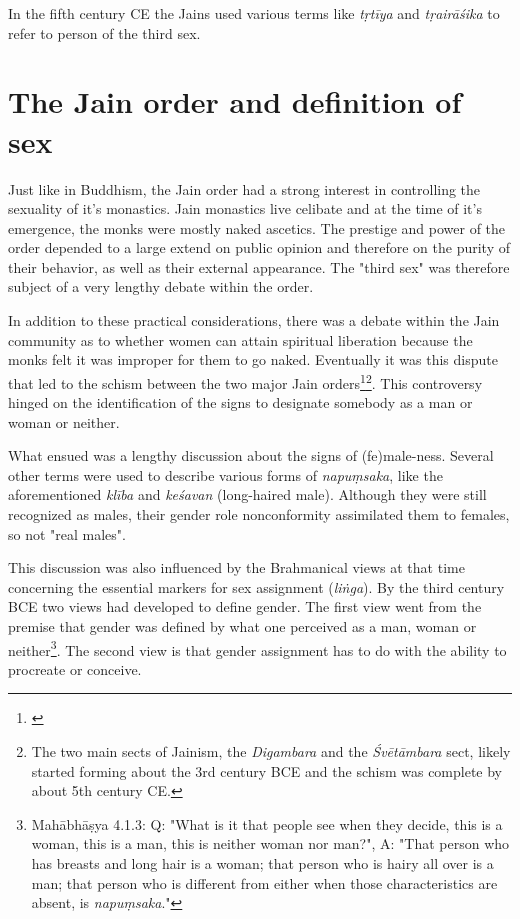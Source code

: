 In the fifth century CE the Jains used various terms like {\em tṛtīya} and {\em tṛairāśika} to refer to person of the third sex. 

\section{The Jain order and definition of sex}
Just like in Buddhism, the Jain order had a strong interest in controlling the sexuality of it's monastics. Jain monastics live celibate and at the time of it's emergence, the monks were mostly naked ascetics. The prestige and power of the order depended to a large extend on public opinion and therefore on the purity of their behavior, as well as their external appearance. The "third sex" was therefore subject of a very lengthy debate within the order. 

In addition to these practical considerations, there was a debate within the Jain community as to whether women can attain spiritual liberation because the monks felt it was improper for them to go naked. Eventually it was this dispute that led to the schism between the two major Jain orders\footnote{\cite{dudas}}\footnote{The two main sects of Jainism, the {\em Digambara} and the {\em Śvētāmbara} sect, likely started forming about the 3rd century BCE and the schism was complete by about 5th century CE.}. This controversy hinged on the identification of the signs to designate somebody as a man or woman or neither. 

What ensued was a lengthy discussion about the signs of (fe)male-ness. Several other terms were used to describe various forms of {\em napuṃsaka}, like the aforementioned {\em klība} and {\em keśavan} (long-haired male). Although they were still recognized as males, their gender role nonconformity assimilated them to females, so not "real males". 

This discussion was also influenced by the Brahmanical views at that time concerning the essential markers for sex assignment ({\em liṅga}). By the third century BCE two views had developed to define gender. The first view went from the premise that gender was defined by what one perceived as a man, woman or neither\footnote{Mahābhāṣya 4.1.3: Q: "What is it that people see when they decide, this is a woman, this is a man, this is neither woman nor man?", A: "That person who has breasts and long hair is a woman; that person who is hairy all over is a man; that person who is different from either when those characteristics are absent, is {\em napuṃsaka}."}. The second view is that gender assignment has to do with the ability to procreate or conceive. 

